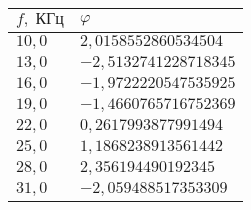 \begin{tabular}{|l|l|}
\hline
$f,\;\text{КГц}$ & $\varphi$\\\hline
$10{,}0$ & $2{,}0158552860534504$\\\hline
$13{,}0$ & $-2{,}5132741228718345$\\\hline
$16{,}0$ & $-1{,}9722220547535925$\\\hline
$19{,}0$ & $-1{,}4660765716752369$\\\hline
$22{,}0$ & $0{,}2617993877991494$\\\hline
$25{,}0$ & $1{,}1868238913561442$\\\hline
$28{,}0$ & $2{,}356194490192345$\\\hline
$31{,}0$ & $-2{,}059488517353309$\\\hline
\end{tabular}
